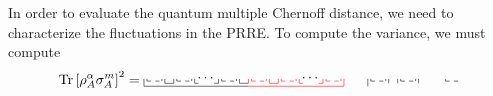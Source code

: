 \documentclass[a4paper,11pt]{article}
\newcommand{\Tr}{\text{Tr}}
\begin{document}
In order to evaluate the quantum multiple Chernoff distance, we need to characterize the fluctuations in the PRRE. To compute the variance, we must compute
\begin{align}
    \Tr \left[ \rho_A^{\alpha} \sigma_A^{m}\right]^2 = 
    \tikz[scale=0.375,baseline=-0.5ex]{
    \draw[dashed] (0,0) -- (1,0);
    \draw (0,0)-- (0,.15);
    \draw (1,0)-- (1,.15);
    \draw (-0.2,0.15)-- (-0.2,-0.35);
    \draw (1.2,-0.15)-- (1.2,0.15);
    \draw[dashed,black] (2,0) -- (3,0);
    \draw[black] (2,0)-- (2,0.15);
    \draw[black] (3,0)-- (3,0.15);
    \draw[black] (1.8,-.15)-- (1.8,0.15);
    \draw[black] (3.2,-0.15)-- (3.2,0.15);
    \draw[dashed,black] (5,0) -- (6,0);
    \draw[black] (5,0)-- (5,0.15);
    \draw[black] (6,0)-- (6,0.15);
    \draw[black] (4.8,0.15)-- (4.8,-0.15);
    \draw[black] (6.2,-0.15)-- (6.2,0.15);
    \draw[red,dashed] (7+0,0) -- (7+1,0);
    \draw[red] (7+0,0)-- (7+0,.15);
    \draw[red] (7+1,0)-- (7+1,.15);
    \draw[red] (7-0.2,0.15)-- (7-0.2,-0.15);
    \draw[red] (7+1.2,-0.15)-- (7+1.2,0.15);
    \draw[dashed,red] (7+2,0) -- (7+3,0);
    \draw[red] (7+2,0)-- (7+2,0.15);
    \draw[red] (7+3,0)-- (7+3,0.15);
    \draw[red] (7+1.8,-.15)-- (7+1.8,0.15);
    \draw[red] (7+3.2,-0.15)-- (7+3.2,0.15);
    \draw[dashed,red] (7+5,0) -- (7+6,0);
    \draw[red] (7+5,0)-- (7+5,0.15);
    \draw[red] (7+6,0)-- (7+6,0.15);
    \draw[red] (7+4.8,0.15)-- (7+4.8,-0.15);
    \draw[red] (7+6.2,-0.35)-- (7+6.2,0.15);
    \draw (1.2,-0.15)--(1.8,-0.15);
    \draw[black] (3.2,-0.15)--(3.45,-0.15);
    \draw (-0.2,-0.35)-- (6.2,-0.35);
    \draw[black] (4.5,-0.15)--(4.8,-0.15);
    \node[] at (4.,0.2) {$\cdots$};
    \draw[black] (7-2+1.2,-0.15)--(7-2+1.8,-0.15);
    \draw[black] (7-2+1.2,-0.35)--(7-2+1.8,-0.35);
    \draw[red] (7+1.2,-0.15)--(7+1.8,-0.15);
    \draw[red] (7+3.2,-0.15)--(7+3.45,-0.15);
    \draw[red] (7-0.2,-0.35)-- (7+6.2,-0.35);
    \draw[red] (7+4.5,-0.15)--(7+4.8,-0.15);
    \node[] at (7+4.,0.2) {$\cdots$};
    \draw[dashed] (15,0) -- (15+1,0);
    \draw (15+0,0)-- (15+0,.15);
    \draw (15+1,0)-- (15+1,.15);
    \draw (15-0.2,0.15)-- (15-0.2,-0.35);
    \draw (15+1.2,-0.15)-- (15+1.2,0.15);
    \draw[dashed,black] (15+2,0) -- (15+3,0);
    \draw[black] (15+2,0)-- (15+2,0.15);
    \draw[black] (15+3,0)-- (15+3,0.15);
    \draw[black] (15+1.8,-.15)-- (15+1.8,0.15);
    \draw[black] (15+3.2,-0.15)-- (15+3.2,0.15);
    \draw[dashed,black] (15+5,0) -- (15+6,0);
    \draw[black] (15+5,0)-- (15+5,0.15);
}
\end{align}
\end{document}
